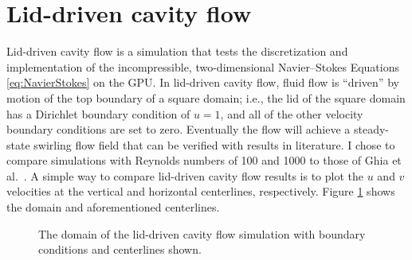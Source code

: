 \section{Lid-driven cavity flow}
Lid-driven cavity flow is a simulation that tests the discretization and implementation of the incompressible, two-dimensional Navier--Stokes Equations \eqref{eq:NavierStokes} on the GPU. 
In lid-driven cavity flow, fluid flow is ``driven'' by motion of the top boundary of a square domain; i.e., the lid of the square domain has a Dirichlet boundary condition of $u=1$, and all of the other velocity boundary conditions are set to zero. 
Eventually the flow will achieve a steady-state swirling flow field that can be verified with results in literature. 
I chose to compare simulations with Reynolds numbers of 100 and 1000 to those of Ghia et al.~\cite{Ghia:1982el}. 
A simple way to compare lid-driven cavity flow results is to plot the $u$ and $v$ velocities at the vertical and horizontal centerlines, respectively. 
Figure \ref{fig:lid driven cavity} shows the domain and aforementioned centerlines. 
\begin{figure}[!htb]
	\centering
	
	\caption{The domain of the lid-driven cavity flow simulation with boundary conditions and centerlines shown.}
	\label{fig:lid driven cavity}
\end{figure}


